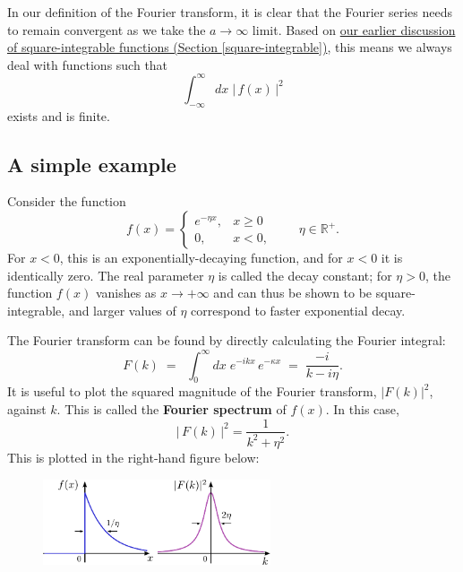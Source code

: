 \documentclass[10pt,a4paper]{article}
\begin{document}
In our definition of the Fourier transform, it is clear that the
Fourier series needs to remain convergent as we take the $a
\rightarrow \infty$ limit. Based on \hyperref[square-integrable]{our
  earlier discussion of square-integrable functions (Section
  \ref{square-integrable})}, this means we always deal with functions
such that
\begin{equation}
  \int_{-\infty}^{\infty} dx\; \big|\,f(x)\,\big|^2
\end{equation}
exists and is finite.

\subsection{A simple example}
\label{simple-example}

Consider the function
\begin{equation}
  f(x) = \left\{\begin{array}{cl}e^{-\eta x}, & x \ge 0 \\
  0, & x < 0,\end{array}\right. \qquad \eta \in \mathbb{R}^+.
\end{equation}
For $x < 0$, this is an exponentially-decaying function, and for $x <
0$ it is identically zero. The real parameter $\eta$ is called the
decay constant; for $\eta > 0$, the function $f(x)$ vanishes as $x
\rightarrow +\infty$ and can thus be shown to be square-integrable,
and larger values of $\eta$ correspond to faster exponential decay.

The Fourier transform can be found by directly calculating the Fourier
integral:
\begin{equation}
  F(k) \;=\; \;\int_{0}^\infty dx\; e^{-i kx}\, e^{-\kappa x} \;=\; \frac{-i}{k - i \eta}.
\end{equation}
It is useful to plot the squared magnitude of the Fourier transform,
$|F(k)|^2$, against $k$. This is called the \textbf{Fourier spectrum}
of $f(x)$. In this case,
\begin{equation}
  \big|\,F(k)\,\big|^2 = \frac{1}{k^2 + \eta^2}.
\end{equation}
This is plotted in the right-hand figure below:

\begin{figure}[h]
  \centering\includegraphics[width=0.6\textwidth]{fourier_example1}
\end{figure}
\end{document}
